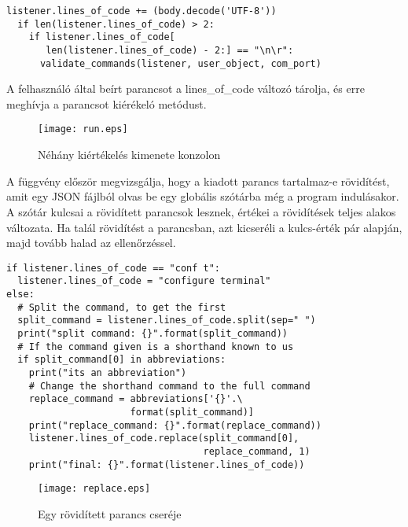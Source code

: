 \documentclass[12pt]{report}
\begin{document}
\begin{verbatim}
listener.lines_of_code += (body.decode('UTF-8'))
  if len(listener.lines_of_code) > 2:
    if listener.lines_of_code[
       len(listener.lines_of_code) - 2:] == "\n\r":
      validate_commands(listener, user_object, com_port)
\end{verbatim}

A felhasználó által beírt parancsot a lines\_of\_code változó tárolja, és erre meghívja a parancsot kiérékeló metódust.

\begin{figure}[h]
    \centering
    \texttt{[image: run.eps]}
    \caption{Néhány kiértékelés kimenete konzolon}
\end{figure}

\newpage

A függvény először megvizsgálja, hogy a kiadott parancs tartalmaz-e rövidítést, amit egy JSON fájlból olvas be egy globális szótárba még a program indulásakor. A szótár kulcsai a rövidített parancsok lesznek, értékei a rövidítések teljes alakos változata. Ha talál rövidítést a parancsban, azt kicseréli a kulcs-érték pár alapján, majd tovább halad az ellenőrzéssel.

\begin{verbatim}
if listener.lines_of_code == "conf t":
  listener.lines_of_code = "configure terminal"
else:
  # Split the command, to get the first
  split_command = listener.lines_of_code.split(sep=" ")
  print("split command: {}".format(split_command))
  # If the command given is a shorthand known to us
  if split_command[0] in abbreviations:
    print("its an abbreviation")
    # Change the shorthand command to the full command
    replace_command = abbreviations['{}'.\
                      format(split_command)]
    print("replace_command: {}".format(replace_command))
    listener.lines_of_code.replace(split_command[0],
                                   replace_command, 1)
    print("final: {}".format(listener.lines_of_code))
\end{verbatim}

\begin{figure}[h]
    \centering
    \texttt{[image: replace.eps]}
    \caption{Egy rövidített parancs cseréje}
\end{figure}
\end{document}
